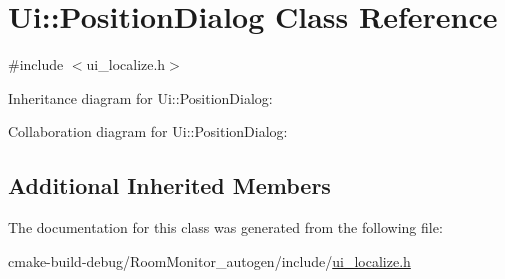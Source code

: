 \hypertarget{class_ui_1_1_position_dialog}{}\section{Ui\+:\+:Position\+Dialog Class Reference}
\label{class_ui_1_1_position_dialog}


{\ttfamily \#include $<$ui\+\_\+localize.\+h$>$}



Inheritance diagram for Ui\+:\+:Position\+Dialog\+:


Collaboration diagram for Ui\+:\+:Position\+Dialog\+:
\subsection*{Additional Inherited Members}


The documentation for this class was generated from the following file\+:\begin{DoxyCompactItemize}
\item 
cmake-\/build-\/debug/\+Room\+Monitor\+\_\+autogen/include/\hyperlink{ui__localize_8h}{ui\+\_\+localize.\+h}\end{DoxyCompactItemize}
